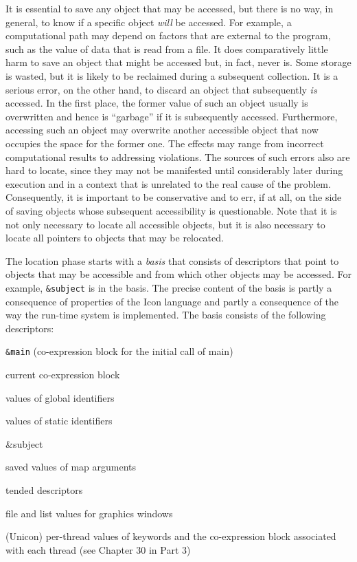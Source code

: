It is essential to save any object that may be accessed, but there is
no way, in general, to know if a specific object \textit{will} be
accessed. For example, a computational path may depend on factors that
are external to the program, such as the value of data that is read
from a file. It does comparatively little harm to save an object that
might be accessed but, in fact, never is. Some storage is wasted, but
it is likely to be reclaimed during a subsequent collection. It is a
serious error, on the other hand, to discard an object that
subsequently \textit{is} accessed. In the first place, the former
value of such an object usually is overwritten and hence is
``garbage'' if it is subsequently accessed. Furthermore, accessing
such an object may overwrite another accessible object that now
occupies the space for the former one. The effects may range from
incorrect computational results to addressing violations. The sources
of such errors also are hard to locate, since they may not be
manifested until considerably later during execution and in a context
that is unrelated to the real cause of the problem. Consequently, it
is important to be conservative and to err, if at all, on the side of
saving objects whose subsequent accessibility is questionable. Note
that it is not only necessary to locate all accessible objects, but it
is also necessary to locate all pointers to objects that may be
relocated.

The location phase starts with a \textit{basis} that consists of
descriptors that point to objects that may be accessible and from
which other objects may be accessed. For example, \texttt{\&subject}
is in the basis. The precise content of the basis is partly a
consequence of properties of the Icon language and partly a
consequence of the way the run-time system is implemented. The basis
consists of the following descriptors:

\liststyleLxiii
\begin{itemize}
\item 
\texttt{\&main} (co-expression block for the initial call of main)
\item 
current co-expression block
\item 
values of global identifiers
\item 
values of static identifiers
\item {\ttfamily
\&subject}
\item 
saved values of map arguments
\item 
tended descriptors
\item
file and list values for graphics windows
{\color{blue}
\item
(Unicon) per-thread values of keywords and the co-expression block
associated with each thread (see Chapter 30 in Part 3) }
\end{itemize}

